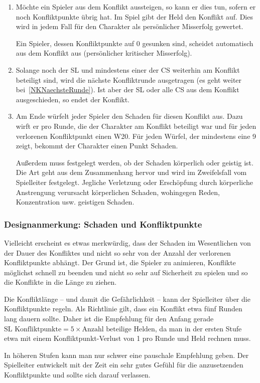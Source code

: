 \begin{enumerate}
  \item Möchte ein Spieler aus dem Konflikt aussteigen, so kann er dies tun, sofern er noch Konfliktpunkte übrig hat. Im Spiel gibt der Held den Konflikt auf. Dies wird in jedem Fall für den Charakter als persönlicher Misserfolg gewertet.

  Ein Spieler, dessen Konfliktpunkte auf 0 gesunken sind, scheidet automatisch aus dem Konflikt aus (persönlicher kritischer Misserfolg).

  \item Solange noch der SL und mindestens einer der CS weiterhin am Konflikt beteiligt sind, wird die nächste Konfliktrunde ausgetragen (es geht weiter bei~\ref{NKNaechsteRunde}). Ist aber der SL oder alle CS aus dem Konflikt ausgeschieden, so endet der Konflikt.

  \item Am Ende würfelt jeder Spieler den Schaden für diesen Konflikt aus. Dazu wirft er pro Runde, die der Charakter am Konflikt beteiligt war und für jeden verlorenen Konfliktpunkt einen W20. Für jeden Würfel, der mindestens eine 9 zeigt, bekommt der Charakter einen Punkt Schaden. 

  Außerdem muss festgelegt werden, ob der Schaden körperlich oder geistig ist. Die Art geht aus dem Zusammenhang hervor und wird im Zweifelsfall vom Spielleiter festgelegt. Jegliche Verletzung oder Erschöpfung durch körperliche Anstrengung verursacht körperlichen Schaden, wohingegen Reden, Konzentration usw. geistigen Schaden. 

\end{enumerate}

\begin{design}
\subsubsection{Designanmerkung: Schaden und Konfliktpunkte}

Vielleicht erscheint es etwas merkwürdig, dass der Schaden im Wesentlichen von der Dauer des Konfliktes und nicht so sehr von der Anzahl der verlorenen Konfliktpunkte abhängt. Der Grund ist, die Spieler zu animieren, Konflikte möglichst schnell zu beenden und nicht so sehr auf Sicherheit zu spielen und so die Konflikte in die Länge zu ziehen.

Die Konfliktlänge -- und damit die Gefährlichkeit -- kann der Spielleiter über die Konfliktpunkte regeln. Als Richtlinie gilt, dass ein Konflikt etwa fünf Runden lang dauern sollte. Daher ist die Empfehlung für den Anfang gerade $\text{SL Konfliktpunkte} = 5 \times \text{Anzahl beteilige Helden}$, da man in der ersten Stufe etwa mit einem Konfliktpunkt-Verlust von 1 pro Runde und Held rechnen muss.

In höheren Stufen kann man nur schwer eine pauschale Empfehlung geben. Der Spielleiter entwickelt mit der Zeit ein sehr gutes Gefühl für die anzusetzenden Konfliktpunkte und sollte sich darauf verlassen.
\end{design}

